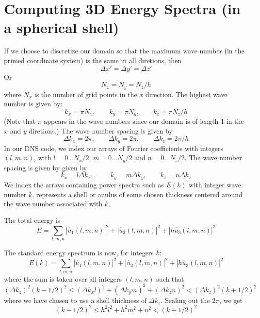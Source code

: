 \documentclass[12pt]{article}
\begin{document}
\section{Computing 3D Energy Spectra (in a spherical shell)}
If we choose to discretize our domain so that the 
maximum wave number (in the primed coordinate system) is
the same in all diretions, then
\[
\Delta x' = \Delta y' = \Delta z'
\]
Or
\[
N_x  = N_y = N_z/h
\]
where $N_x$ is the number of grid points in the $x$ direction.
The highest wave number is given by:
\[
k_x = \pi N_x, \qquad k_y = \pi N_y, \qquad k_z = \pi N_z/h 
\]
(Note that $\pi$ appears in the wave numbers since our domain is
of length 1 in the $x$ and $y$ diretions.)  The wave number spacing
is given by
\[
\Delta k_x = 2 \pi, \qquad  \Delta k_y = 2 \pi, \qquad  \Delta k_z = 2 \pi / h 
\]
In our DNS code, we index our arrays of Fourier coefficients
with integers $(l,m,n)$, with $l=0 \dots N_x/2$, 
$m=0 \dots N_y/2$ and 
$n=0 \dots N_z/2$.  The wave number spacing is given by
given by
\[
k_x = l \Delta k_x,, \qquad  k_y = m \Delta k_y, \qquad  k_z = n  \Delta k_z
\]
We index the arrays containing power spectra
such as $E(k)$ with integer wave number $k$, represents a shell or anulus
of some chosen thickness centered around the wave number associated
with $k$.

The total energy is
\[
E  = \sum_{l,m,n}  |  {\hat u_1}(l,m,n) |^2 +
 |  {\hat u_2}(l,m,n) |^2 + 
 |  h {\hat u_3}(l,m,n) |^2
\]

The standard energy spectrum is now, for integers $k$:
\[
E(k)  = \sum_{l,m,n}  |  {\hat u_1}(l,m,n) |^2 +
 |  {\hat u_2}(l,m,n) |^2 + 
 |  h {\hat u_3}(l,m,n) |^2
\]
where the sum is taken over all integers $(l,m,n)$ such that
\[
(\Delta k_z)^2 (k-1/2)^2 \le (\Delta k_x l)^2 + (\Delta k_y m)^2 + (\Delta k_z n)^2 <  (\Delta k_z)^2 (k+1/2)^2 
\]
where we have chosen to use a shell thickness of $\Delta k_z$.
Scaling out the $2\pi$, we get
\[
(k-1/2)^2 \le  h^2 l^2 + h^2 m^2 + n^2 < (k+1/2)^2
\]  
\end{document}

